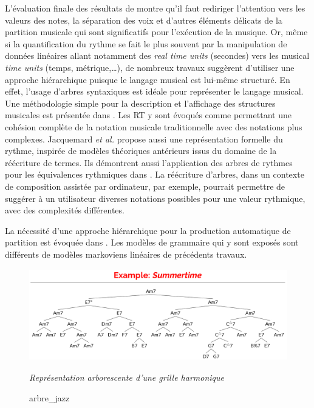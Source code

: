 L’évaluation finale des résultats de \cite{SHIBATA2021262} montre qu’il faut rediriger l’attention vers les valeurs des notes, la séparation des voix et d'autres éléments délicats de la partition musicale qui sont significatifs pour l'exécution de la musique. 
Or, même si la quantification du rythme se fait le plus souvent par la manipulation de données linéaires allant notamment des \textit{real time units} (secondes) vers les musical \textit{time units} (temps, métrique,…), de nombreux travaux suggèrent d’utiliser une approche hiérarchique puisque le langage musical est lui-même structuré.
%
%
En effet, l’usage d’arbres syntaxiques est idéale pour représenter le langage musical. 
Une méthodologie simple pour la description et l'affichage des structures musicales est présentée dans \cite{rythm_tree}. 
Les RT 
y sont évoqués comme permettant une cohésion complète de la notation musicale traditionnelle avec des notations plus complexes. Jacquemard \textit{et al.} 
\cite{jacquemard:hal-01134096} propose aussi une représentation formelle du rythme, 
inspirée de modèles théoriques antérieurs issus du domaine de la réécriture de termes. 
Ils démontrent aussi l’application des arbres de rythmes pour 
les équivalences rythmiques dans \cite{jacquemard:hal-01403982}. 
La réécriture d’arbres, dans un contexte de composition assistée par ordinateur, 
par exemple, pourrait permettre de suggérer à un utilisateur diverses notations possibles pour une valeur rythmique, avec des complexités différentes.

La nécessité d’une approche hiérarchique pour la production automatique de partition est évoquée dans \cite{foscarin:hal-01988990}. 
Les modèles de grammaire qui y sont exposés sont différents de modèles markoviens linéaires de précédents travaux.\newpage
\begin{figure}[h]
	\centering
	\includegraphics[height=40mm, width=120mm]{z_images/2_etat_de_l_art/1_summertime_tree.png}
	\caption{arbre\_jazz}
	\textit{Représentation arborescente d’une grille harmonique} \cite{harasimjazz}
\end{figure}

